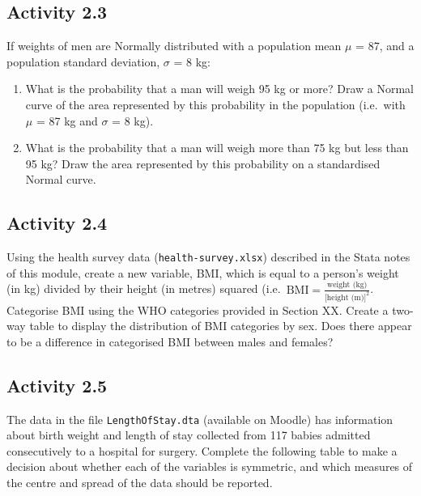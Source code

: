 \documentclass[
]{memoir}
\providecommand{\tightlist}{%
  \setlength{\itemsep}{0pt}\setlength{\parskip}{0pt}}
\begin{document}
\hypertarget{activity-2.3}{%
\subsection*{Activity 2.3}\label{activity-2.3}}

If weights of men are Normally distributed with a population mean \(\mu\) = 87, and a population standard deviation, \(\sigma\) = 8 kg:

\begin{enumerate}
\def\labelenumi{\alph{enumi})}
\tightlist
\item
  What is the probability that a man will weigh 95 kg or more? Draw a Normal curve of the area represented by this probability in the population (i.e.~with \(\mu\) = 87 kg and \(\sigma\) = 8 kg).
\item
  What is the probability that a man will weigh more than 75 kg but less than 95 kg? Draw the area represented by this probability on a standardised Normal curve.
\end{enumerate}

\hypertarget{activity-2.4}{%
\subsection*{Activity 2.4}\label{activity-2.4}}

Using the health survey data (\texttt{health-survey.xlsx}) described in the Stata notes of this module, create a new variable, BMI, which is equal to a person's weight (in kg) divided by their height (in metres) squared (i.e.~\(\text{BMI} = \frac{\text{weight (kg)}}{\text{[height (m)]}^2}\). Categorise BMI using the WHO categories provided in Section XX. Create a two-way table to display the distribution of BMI categories by sex. Does there appear to be a difference in categorised BMI between males and females?

\hypertarget{activity-2.5}{%
\subsection*{Activity 2.5}\label{activity-2.5}}

The data in the file \texttt{LengthOfStay.dta} (available on Moodle) has information about birth weight and length of stay collected from 117 babies admitted consecutively to a hospital for surgery. Complete the following table to make a decision about whether each of the variables is symmetric, and which measures of the centre and spread of the data should be reported.
\end{document}

